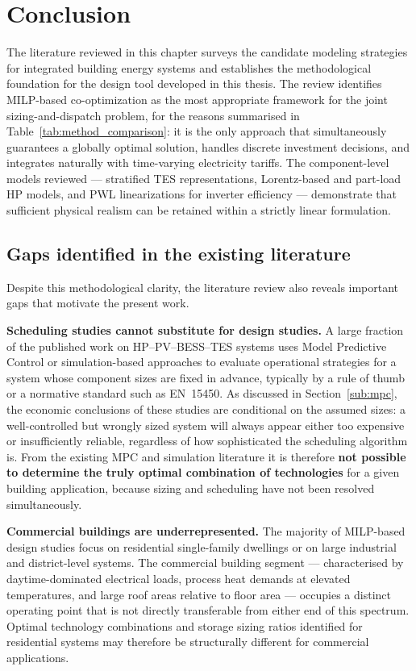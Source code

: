 \documentclass[11pt,a4paper]{report}
\begin{document}
\section{Conclusion}
The literature reviewed in this chapter surveys the candidate modeling strategies for integrated building energy systems and establishes the methodological foundation for the design tool developed in this thesis.
The review identifies MILP-based co-optimization as the most appropriate framework for the joint sizing-and-dispatch problem, for the reasons summarised in Table~\ref{tab:method_comparison}: it is the only approach that simultaneously guarantees a globally optimal solution, handles discrete investment decisions, and integrates naturally with time-varying electricity tariffs.
The component-level models reviewed --- stratified TES representations, Lorentz-based and part-load HP models, and PWL linearizations for inverter efficiency --- demonstrate that sufficient physical realism can be retained within a strictly linear formulation.

\subsection*{Gaps identified in the existing literature}

Despite this methodological clarity, the literature review also reveals important gaps that motivate the present work.

\textbf{Scheduling studies cannot substitute for design studies.}
A large fraction of the published work on HP--PV--BESS--TES systems uses Model Predictive Control or simulation-based approaches to evaluate operational strategies for a system whose component sizes are fixed in advance, typically by a rule of thumb or a normative standard such as EN~15450.
As discussed in Section~\ref{sub:mpc}, the economic conclusions of these studies are conditional on the assumed sizes: a well-controlled but wrongly sized system will always appear either too expensive or insufficiently reliable, regardless of how sophisticated the scheduling algorithm is.
From the existing MPC and simulation literature it is therefore \textbf{not possible to determine the truly optimal combination of technologies} for a given building application, because sizing and scheduling have not been resolved simultaneously.

\textbf{Commercial buildings are underrepresented.}
The majority of MILP-based design studies focus on residential single-family dwellings or on large industrial and district-level systems.
The commercial building segment --- characterised by daytime-dominated electrical loads, process heat demands at elevated temperatures, and large roof areas relative to floor area --- occupies a distinct operating point that is not directly transferable from either end of this spectrum.
Optimal technology combinations and storage sizing ratios identified for residential systems may therefore be structurally different for commercial applications.
\end{document}
